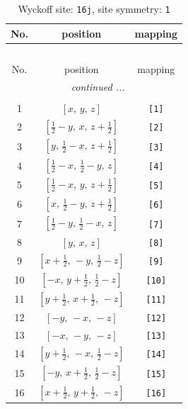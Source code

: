 \documentclass[fleqn,8pt]{jsarticle}
\begin{document}
\begin{longtable}{ccc}
\caption{Wyckoff site: {\tt 16j}, site symmetry: {\tt 1}}
 \\
 \hline \hline
No. & position & mapping \\ \hline \endfirsthead

\multicolumn{2}{l}{\tablename\ \thetable{}} \\
 \hline \hline
No. & position & mapping \\ \hline \endhead

 \hline \hline
\multicolumn{2}{r}{\footnotesize\it continued ...} \\ \endfoot

 \hline \hline
\multicolumn{2}{r}{} \\ \endlastfoot

1 & $\left[ x,\, y,\, z \right]$ & {\tt [1]} \\ \hline
2 & $\left[ \frac{1}{2} - y,\, x,\, z + \frac{1}{2} \right]$ & {\tt [2]} \\ \hline
3 & $\left[ y,\, \frac{1}{2} - x,\, z + \frac{1}{2} \right]$ & {\tt [3]} \\ \hline
4 & $\left[ \frac{1}{2} - x,\, \frac{1}{2} - y,\, z \right]$ & {\tt [4]} \\ \hline
5 & $\left[ \frac{1}{2} - x,\, y,\, z + \frac{1}{2} \right]$ & {\tt [5]} \\ \hline
6 & $\left[ x,\, \frac{1}{2} - y,\, z + \frac{1}{2} \right]$ & {\tt [6]} \\ \hline
7 & $\left[ \frac{1}{2} - y,\, \frac{1}{2} - x,\, z \right]$ & {\tt [7]} \\ \hline
8 & $\left[ y,\, x,\, z \right]$ & {\tt [8]} \\ \hline
9 & $\left[ x + \frac{1}{2},\, - y,\, \frac{1}{2} - z \right]$ & {\tt [9]} \\ \hline
10 & $\left[ - x,\, y + \frac{1}{2},\, \frac{1}{2} - z \right]$ & {\tt [10]} \\ \hline
11 & $\left[ y + \frac{1}{2},\, x + \frac{1}{2},\, - z \right]$ & {\tt [11]} \\ \hline
12 & $\left[ - y,\, - x,\, - z \right]$ & {\tt [12]} \\ \hline
13 & $\left[ - x,\, - y,\, - z \right]$ & {\tt [13]} \\ \hline
14 & $\left[ y + \frac{1}{2},\, - x,\, \frac{1}{2} - z \right]$ & {\tt [14]} \\ \hline
15 & $\left[ - y,\, x + \frac{1}{2},\, \frac{1}{2} - z \right]$ & {\tt [15]} \\ \hline
16 & $\left[ x + \frac{1}{2},\, y + \frac{1}{2},\, - z \right]$ & {\tt [16]} \\
\end{longtable}
\end{document}
